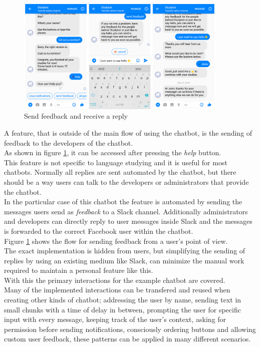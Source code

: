 \begin{figure}[h]
  \centering
  \includegraphics[width=0.9\textwidth]{images/interface/09-feedback.png}
	\caption{Send feedback and receive a reply}
	\label{fig:09-feedback}
\end{figure}

\label{slackhook}

A feature, that is outside of the main flow of using the chatbot, is the sending of feedback to the developers of the chatbot.
\\
As shown in figure \ref{fig:09-feedback}, it can be accessed after pressing the \emph{help} button.
\\
This feature is not specific to language studying and it is useful for most chatbots.
Normally all replies are sent automated by the chatbot,
but there should be a way users can talk to the developers or administrators that provide the chatbot.
\\
In the particular case of this chatbot the feature is automated by sending the messages users send as \emph{feedback}
to a Slack channel\cite{slack}.
Additionally administrators and developers can directly reply to user messages inside Slack
and the messages is forwarded to the correct Facebook user within the chatbot.
\\
Figure \ref{fig:09-feedback} shows the flow for sending feedback from a user's point of view.
\\
The exact implementation is hidden from users,
but simplifying the sending of replies by using an existing medium like Slack,
can minimize the manual work required to maintain a personal feature like this.
\\


With this the primary interactions for the example chatbot are covered.
\\
Many of the implemented interactions can be transfered and reused when creating other kinds of chatbot;
addressing the user by name,
sending text in small chunks with a time of delay in between,
prompting the user for specific input with every message,
keeping track of the user's context,
asking for permission before sending notifications,
consciously ordering buttons and
allowing custom user feedback,
these patterns can be applied in many different scenarios.
\\

